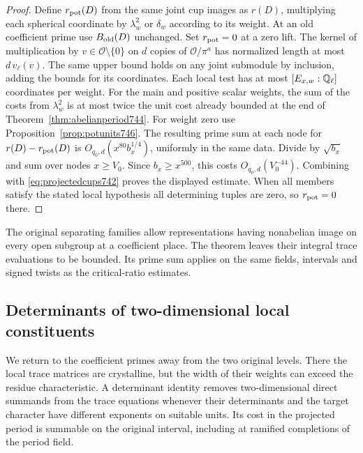 \documentclass[a4paper,11pt]{article}
\theoremstyle{definition}
\theoremstyle{remark}
\numberwithin{equation}{section}
\begin{document}
\begin{proof}
Define \(r_{\rm pot}(D)\) from the same joint cup images as \(r(D)\),
multiplying each spherical coordinate by \(\lambda_w^2\) or
\(\delta_w\) according to its weight. At an old coefficient prime
use \(B_{\rm old}(D)\) unchanged. Set \(r_{\rm pot}=0\) at a zero lift.
The kernel of multiplication by \(v\in\mathcal O\setminus\{0\}\)
on \(d\) copies of \(\mathcal O/\pi^a\) has normalized length
at most \(d\,v_\ell(v)\). The same upper bound holds on any
joint submodule by inclusion, adding the bounds for its coordinates.
Each local test has at most \([E_{x,w}:\mathbb Q_\ell]\) coordinates
per weight. For the main and positive scalar weights, the sum
of the costs from \(\lambda_w^2\) is at most twice the unit
cost already bounded at the end of Theorem~\ref{thm:abelianperiod744}.
For weight zero use Proposition~\ref{prop:potunits746}.
The resulting prime sum at each node for \(r(D)-r_{\rm pot}(D)\)
is \(O_{q_0,d}(x^{80}b_x^{1/4})\), uniformly in the same data.
Divide by \(\sqrt{b_x}\) and sum over nodes \(x\ge V_0\).
Since \(b_x\ge x^{500}\), this costs \(O_{q_0,d}(V_0^{-44})\).
Combining with \eqref{eq:projectedcups742} proves the displayed
estimate. When all members satisfy the stated local hypothesis
all determining tuples are zero, so \(r_{\rm pot}=0\) there.
\end{proof}

The original separating families allow representations having
nonabelian image on every open subgroup at a coefficient place.
The theorem leaves their integral trace evaluations to be bounded.
Its prime sum applies on the same fields, intervals and signed
twists as the critical-ratio estimates.
\clearpage

\subsection{Determinants of two-dimensional local constituents}
\label{sec:twodeterminants754}
We return to the coefficient primes away from the two original
levels. There the local trace matrices are crystalline, but
the width of their weights can exceed the residue characteristic.
A determinant identity removes two-dimensional direct summands
from the trace equations whenever their determinants and the
target character have different exponents on suitable units.
Its cost in the projected period is summable on the original
interval, including at ramified completions of the period field.
\end{document}
